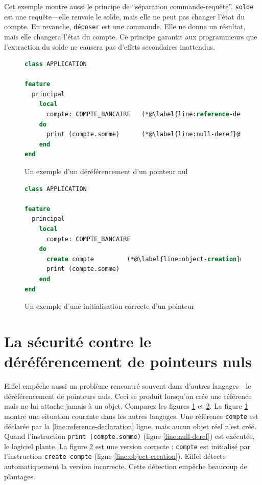 \documentclass[french]{report}
\begin{document}
Cet exemple montre aussi le principe de \enquote{séparation commande-requête}. \texttt{solde} est une requête---elle renvoie le solde, mais elle ne peut pas changer l'état du compte. En revanche, \texttt{déposer} est une commande. Elle ne donne un résultat, mais elle changera l'état du compte. Ce principe garantit aux programmeurs que l'extraction du solde ne causera pas d'effets secondaires inattendus.

\begin{figure}[h]
	\begin{lstlisting}[language=Eiffel]
class APPLICATION

feature
  principal
    local
      compte: COMPTE_BANCAIRE 	(*@\label{line:reference-declaration}@*)
    do
      print (compte.somme)		(*@\label{line:null-deref}@*)
    end
end
	\end{lstlisting}
	
	\caption{Un exemple d'un déréférencement d'un pointeur nul}
	\label{fig:null-deref-condition}
\end{figure}

\begin{figure}[h]
	\begin{lstlisting}[language=Eiffel]
class APPLICATION
	
feature
  principal
    local
      compte: COMPTE_BANCAIRE
    do
      create compte 		(*@\label{line:object-creation}@*)
      print (compte.somme) 	
    end
end
	\end{lstlisting}
	
	\caption{Un exemple d'une initialisation correcte d'un pointeur}
	\label{fig:nonnull-deref-condition}
\end{figure}

\section{La sécurité contre le déréférencement de pointeurs nuls}

Eiffel empêche aussi un problème rencontré souvent dans d'autres langages---le déréférencement de pointeurs nuls. Ceci se produit lorsqu'on crée une référence mais ne lui attache jamais à un objet. Comparez les figures \ref{fig:null-deref-condition} et \ref{fig:nonnull-deref-condition}. La figure \ref{fig:null-deref-condition} montre une situation courante dans les autres langages. Une référence \texttt{compte} est déclarée par la \ref{line:reference-declaration}\ieme{} ligne, mais aucun objet réel n'est créé. Quand l'instruction \texttt{print (compte.somme)} (ligne \ref{line:null-deref}) est exécutée, le logiciel plante. La figure \ref{fig:nonnull-deref-condition} est une version correcte : \texttt{compte} est initialisé par l'instruction \texttt{create compte} (ligne \ref{line:object-creation}). Eiffel détecte automatiquement la version incorrecte. Cette détection empêche beaucoup de plantages.
\end{document}
